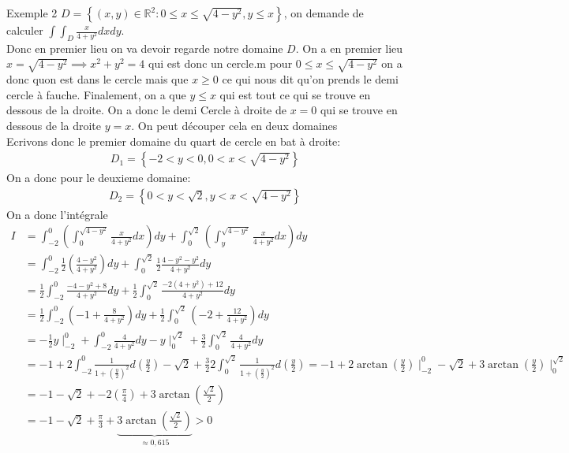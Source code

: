\begin{parag}{Exemple 2}
    $D =  \left\{\left(x, y\right) \in \mathbb{R}^{2} : 0 \leq x \leq \sqrt{4 - y^2}, y \leq x\right\}$, on demande de calculer $\int\int_D \frac{x}{4 + y^2}dxdy$.\\
    Donc en premier lieu on va devoir regarde notre domaine $D$. On a en premier lieu $x =  \sqrt{4-y^2} \implies x^2 + y^2 =  4$ qui est donc un cercle.m pour $0 \leq x \leq \sqrt{4-y^2}$ on a donc quon est dans le cercle mais que $x \geq 0$ ce qui nous dit qu'on prends le demi cercle à fauche. Finalement, on a que $y \leq x$ qui est tout ce qui se trouve en dessous de la droite. On a donc le demi Cercle à droite de $x =  0$ qui se trouve en dessous de la droite $y = x$. On peut découper cela en deux domaines\\
    Ecrivons donc le premier domaine du quart de cercle en bat à droite:
    \begin{align*} D_1 = \left\{-2 < y < 0, 0 < x < \sqrt{4-y^2}\right\} \end{align*}
    On a donc pour le deuxieme domaine:
    \begin{align*} 
        D_2 = \left\{0 < y < \sqrt{2}, y < x < \sqrt{4 - y^2}\right\}
    \end{align*}
    On a donc l'intégrale
    \begin{align*} 
        I &= \int_{-2}^0\left(\int_0^{\sqrt{4-y^2}}\frac{x}{4 + y^2}dx\right)dy + \int_0^{\sqrt{2}}\left(\int_y^{\sqrt{4-y^2}}\frac{x}{4 + y^2}dx\right)dy\\
          &= \int_{-2}^0\frac{1}{2}\left(\frac{4-y^2}{4 + y^2}\right)dy + \int_0^{\sqrt{2}}\frac{1}{2}\frac{4-y^2 - y^2}{4 + y^2}dy\\
          &= \frac{1}{2}\int_{-2}^0\frac{-4 - y^2 + 8}{4 + y^2}dy + \frac{1}{2}\int_0^{\sqrt{2}} \frac{-2\left(4 + y^2\right) + 12}{4 + y^2} dy\\
          &= \frac{1}{2} \int_{-2}^0\left(-1 + \frac{8}{4 + y^2}\right)dy + \frac{1}{2}\int_0^{\sqrt{2}}\left(-2 + \frac{12}{4+y^2}\right)dy\\
          &= -\frac{1}{2}y \mid_{-2}^0 + \int_{-2}^0 \frac{4}{4 + y^2}dy - y \mid_0^{\sqrt{2}} + \frac{3}{2}\int_{0}^{\sqrt{2}}\frac{4}{4 + y^2}dy\\
          &= - 1 + 2\int_{-2}^0 \frac{1}{1 + \left(\frac{y}{2}\right)^2}d\left(\frac{y}{2}\right) - \sqrt{2} + \frac{3}{2} 2\int_0^{\sqrt{2}} \frac{1}{1 + \left(\frac{y}{2}\right)^2} d\left(\frac{y}{2}\right) =  - 1 + 2 \arctan \left( \frac{y}{2}\right)\mid_{-2}^0 - \sqrt{2} + 3\arctan\left(\frac{y}{2}\right) \mid_0^{\sqrt{2}}\\
          &= - 1 - \sqrt{2} + -2\left(\frac{\pi}{4}\right) + 3 \arctan\left(\frac{\sqrt{2}}{2}\right) \\
          &= -1 - \sqrt{2} + \frac{\pi}{3} + \underbrace{3\arctan\left(\frac{\sqrt{2}}{2}\right)}_{\approx 0,615} > 0
    \end{align*}

\end{parag}


